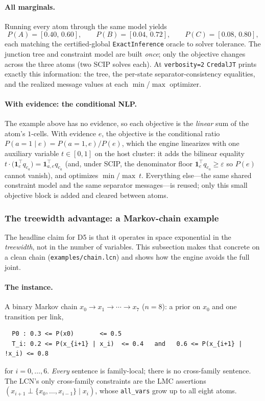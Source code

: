 \documentclass[11pt]{article}
\begin{document}
\paragraph{All marginals.} Running every atom through the same model yields
\[
  P(A)=[0.40,\,0.60],\qquad P(B)=[0.04,\,0.72],\qquad P(C)=[0.08,\,0.80],
\]
each matching the certified-global \texttt{ExactInference} oracle to solver tolerance. The
junction tree and constraint model are built \emph{once}; only the objective changes across the
three atoms (two SCIP solves each). At \texttt{verbosity=2} \texttt{CredalJT} prints exactly this
information: the tree, the per-state separator-consistency equalities, and the realized message
values at each $\min$/$\max$ optimizer.

\paragraph{With evidence: the conditional NLP.} The example above has no evidence, so each
objective is the \emph{linear} sum of the atom's $1$-cells. With evidence $e$, the objective is
the conditional ratio $P(a{=}1\mid e)=P(a{=}1,e)/P(e)$, which the engine linearizes with one
auxiliary variable $t\in[0,1]$ on the host cluster: it adds the bilinear equality
$t\cdot\big(\mathbf 1_{e}^\top q_{c_a}\big)=\mathbf 1_{a,e}^\top q_{c_a}$ (and, under SCIP, the
denominator floor $\mathbf 1_{e}^\top q_{c_a}\ge\varepsilon$ so $P(e)$ cannot vanish), and
optimizes $\min/\max\ t$. Everything else---the same shared constraint model and the same
separator messages---is reused; only this small objective block is added and cleared between
atoms.

\subsubsection{The treewidth advantage: a Markov-chain example}\label{sec:d5-treewidth}

The headline claim for D5 is that it operates in space exponential in the \emph{treewidth}, not
in the number of variables. This subsection makes that concrete on a clean chain
(\texttt{examples/chain.lcn}) and shows how the engine avoids the full joint.

\paragraph{The instance.} A binary Markov chain $x_0\to x_1\to\cdots\to x_7$ ($n=8$): a prior on
$x_0$ and one transition per link,
\begin{verbatim}
  P0 : 0.3 <= P(x0)       <= 0.5
  T_i: 0.2 <= P(x_{i+1} | x_i)  <= 0.4   and   0.6 <= P(x_{i+1} | !x_i) <= 0.8
\end{verbatim}
for $i=0,\dots,6$. \emph{Every} sentence is family-local; there is no cross-family sentence. The
LCN's only cross-family constraints are the LMC assertions
$(x_{i+1}\perp\{x_0,\dots,x_{i-1}\}\mid x_i)$, whose \texttt{all\_vars} grow up to all eight atoms.
\end{document}
